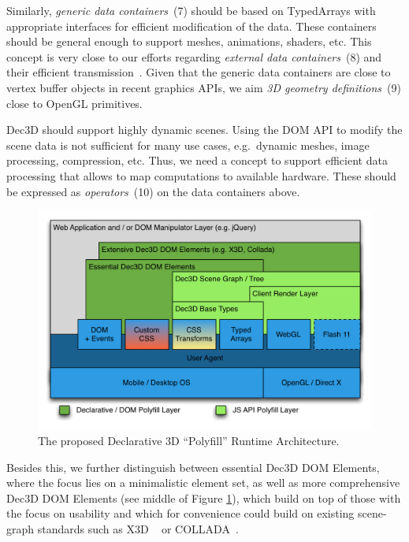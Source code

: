 \documentclass{acmsiggraph}
\begin{document}
Similarly, \textit{generic data containers}~(7) should be based on TypedArrays \cite{TypArr12} with appropriate interfaces for efficient modification of the data. These containers should be general enough to support meshes, animations, shaders, etc. This concept is very close to our efforts regarding \textit{external data containers}~(8) and their efficient transmission~\cite{Behr12,Trevett12}. Given that the generic data containers are close to vertex buffer objects in recent graphics APIs, we aim \textit{3D geometry definitions}~(9) close to OpenGL primitives.

Dec3D should support highly dynamic scenes. Using the DOM API to modify the scene data is not sufficient for many use cases, e.g.\ dynamic meshes, image processing, compression, etc. Thus, we need a concept to support efficient data processing that allows to map computations to available hardware. These should be expressed as \textit{operators}~(10) on the data containers above.

\begin{figure}
  \centering
  \includegraphics[width=1.0\columnwidth]{images/Dec3D-Architecture.png}
  \caption{The proposed Declarative 3D ``Polyfill'' Runtime Architecture.}
  \label{fig:polyArch}
\end{figure}

Besides this, we further distinguish between essential Dec3D DOM Elements, where the focus lies on a minimalistic element set, as well as more comprehensive Dec3D DOM Elements (see middle of Figure \ref{fig:polyArch}), which build on top of those with the focus on usability and which for convenience could build on existing scene-graph standards such as X3D ~\cite{Web3D-X3D} or COLLADA~\cite{Arnaud06}.
\end{document}
